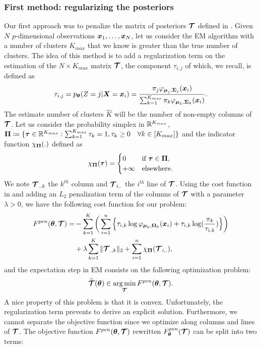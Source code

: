 \subsubsection{First method: regularizing the posteriors}
Our first approach was to penalize the matrix of posteriors $\boldsymbol{\mathcal T}$ defined in . Given $N$ $p$-dimensional observations $\boldsymbol x_1,\dots,\boldsymbol x_N$, let us consider the EM algorithm with a number of clusters $K_{max}$ that we know is greater than the true number of clusters. The idea of this method is to add a regularization term on the estimation of the $N\times K_{max}$ matrix $\boldsymbol{\mathcal T}$, the component $\tau_{i,j}$ of which, we recall, is defined as 
\begin{equation}
  \tau_{i,j} = p_{{\boldsymbol\theta}}(Z=j | \boldsymbol X=\boldsymbol x_i) = \frac{\pi_j\varphi_{\boldsymbol\mu_j,\boldsymbol\Sigma_j}(\boldsymbol x_i)}{\sum_{k=1}^{K_{max}}\pi_k\varphi_{\boldsymbol\mu_k,\boldsymbol\Sigma_k}(\boldsymbol x_i)}.
\end{equation}
The estimate number of clusters $\hat K$ will be the number of non-empty columns of $\boldsymbol{\mathcal T}$. Let us consider the probability simplex in ${\mathbb R}^{K_{max}}$, $\boldsymbol\Pi\coloneqq \{\boldsymbol\tau \in {\mathbb R}^{K_{max}} : \sum_{k=1}^{K_{max}}\tau_k=1, \tau_k\geq 0 \quad \forall k \in [K_{max}] \}$ and the indicator function $\chi_{\boldsymbol\Pi}(.)$ defined as
\begin{equation*}
    \chi_{\boldsymbol\Pi}(\boldsymbol\tau) =
    \begin{cases}
      0 & \text{if } \boldsymbol\tau \in \boldsymbol\Pi,\\
        +\infty & \text{elsewhere}.
    \end{cases}
\end{equation*}
We note $\boldsymbol{\mathcal T}_{.,k}$ the $k^{th}$ column and $\boldsymbol{\mathcal T}_{i,.}$ the $i^{th}$ line of $\boldsymbol{\mathcal T}$. Using the cost function in  and adding an $L_2$ penalization term of the columns of $\boldsymbol{\mathcal T}$ with a parameter $\lambda > 0$, we have the following cost function for our problem:
\begin{align*}
F^{pen}({\boldsymbol\theta},\boldsymbol{\mathcal T})  =& -\sum_{k=1}^K \bigg(\sum_{i=1}^{n} \Big\{\tau_{i,k}\log\varphi_{\boldsymbol\mu_{k},\boldsymbol\Omega_{k}}(\boldsymbol x_i)+\tau_{i,k}\log(\frac{\pi_k}{\tau_{i,k}})\Big\}\bigg)\\
&+ \lambda\sum_{k=1}^K \|\boldsymbol{\mathcal T}_{.,k}\|_{2} + \sum_{i=1}^{n} \chi_{\boldsymbol\Pi}(\boldsymbol{\mathcal T}_{i,.}),
\end{align*}
 and the expectation step in EM consists on the following optimization problem:
\begin{equation}
\widehat{\boldsymbol{\mathcal T}}({\boldsymbol\theta})\in \operatorname*{arg\,min}_{\boldsymbol{\mathcal T}} F^{pen}({\boldsymbol\theta},\boldsymbol{\mathcal T}).
\end{equation}
A nice property of this problem is that it is convex. Unfortunately, the regularization term prevents to derive an explicit solution. Furthermore, we cannot separate the objective function since we optimize along columns and lines of $\boldsymbol{\mathcal T}$. The objective function $F^{pen}({\boldsymbol\theta},\boldsymbol{\mathcal T})$ rewritten $F^{pen}_{{\boldsymbol\theta}}(\boldsymbol{\mathcal T})$ can be split into two terms:
